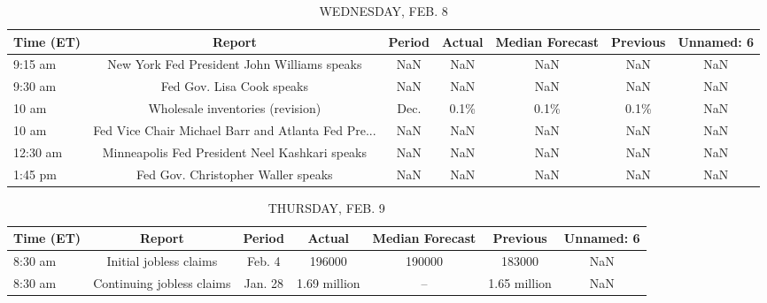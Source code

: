 \documentclass{article}%
\begin{document}
\begin{table}[htbp]%
\caption{WEDNESDAY, FEB. 8}%
\centering%
\begin{adjustbox}{width=1\textwidth}%
\begin{tabular}{lcccccc}
\toprule
Time (ET) &                                             Report & Period & Actual & Median Forecast & Previous & Unnamed: 6 \\
\midrule
  9:15 am &        New York Fed President John Williams speaks &    NaN &    NaN &             NaN &      NaN &        NaN \\
  9:30 am &                          Fed Gov. Lisa Cook speaks &    NaN &    NaN &             NaN &      NaN &        NaN \\
    10 am &                   Wholesale inventories (revision) &   Dec. &   0.1\% &            0.1\% &     0.1\% &        NaN \\
    10 am & Fed Vice Chair Michael Barr and Atlanta Fed Pre... &    NaN &    NaN &             NaN &      NaN &        NaN \\
 12:30 am &     Minneapolis Fed President Neel Kashkari speaks &    NaN &    NaN &             NaN &      NaN &        NaN \\
  1:45 pm &                 Fed Gov. Christopher Waller speaks &    NaN &    NaN &             NaN &      NaN &        NaN \\
\bottomrule
\end{tabular}
%
\end{adjustbox}%
\end{table}

%


\begin{table}[htbp]%
\caption{THURSDAY, FEB. 9}%
\centering%
\begin{adjustbox}{width=1\textwidth}%
\begin{tabular}{lcccccc}
\toprule
Time (ET) &                    Report &  Period &       Actual & Median Forecast &     Previous & Unnamed: 6 \\
\midrule
  8:30 am &    Initial jobless claims &  Feb. 4 &       196000 &          190000 &       183000 &        NaN \\
  8:30 am & Continuing jobless claims & Jan. 28 & 1.69 million &              -- & 1.65 million &        NaN \\
\bottomrule
\end{tabular}
%
\end{adjustbox}%
\end{table}
\end{document}
